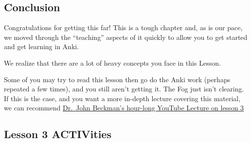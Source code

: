 \documentclass[
]{turabian-researchpaper}
\begin{document}
\hypertarget{conclusion}{%
\subsection*{Conclusion}\label{conclusion}}

Congratulations for getting this far! This is a tough chapter and, as is our pace, we moved through the ``teaching'' aspects of it quickly to allow you to get started and get learning in Anki.

We realize that there are a lot of heavy concepts you face in this Lesson.

Some of you may try to read this lesson then go do the Anki work (perhaps repeated a few times), and you still aren't getting it. The Fog just isn't clearing. If this is the case, and you want a more in-depth lecture covering this material, we can recommend \href{https://www.youtube.com/watch?v=AY7KAsD4fZg\&feature=youtu.be}{Dr.~John Beckman's hour-long YouTube Lecture on lesson 3}

\hypertarget{three_8}{%
\subsection{Lesson 3 ACTIVities}\label{three_8}}
\end{document}
